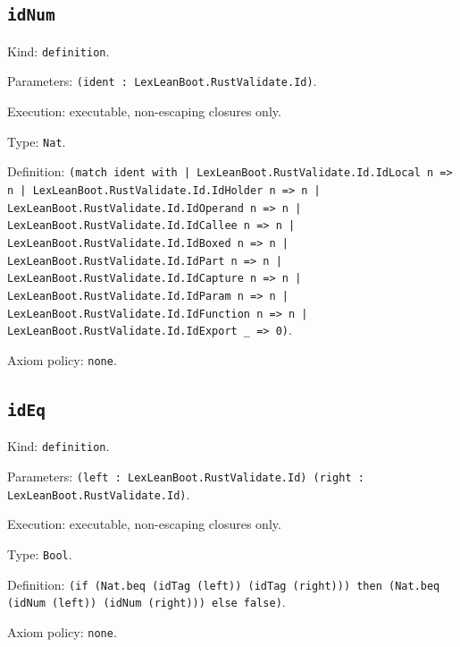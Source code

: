 \documentclass[11pt]{article}
\begin{document}
\subsection*{\texttt{idNum}}
\noindent Kind: \texttt{definition}.\par
\noindent Parameters: \texttt{(ident : LexLeanBoot.RustValidate.Id)}.\par
\noindent Execution: executable, non-escaping closures only.\par
\noindent Type: \texttt{Nat}.\par
\noindent Definition: \texttt{(match ident with | LexLeanBoot.RustValidate.Id.IdLocal n => n | LexLeanBoot.RustValidate.Id.IdHolder n => n | LexLeanBoot.RustValidate.Id.IdOperand n => n | LexLeanBoot.RustValidate.Id.IdCallee n => n | LexLeanBoot.RustValidate.Id.IdBoxed n => n | LexLeanBoot.RustValidate.Id.IdPart n => n | LexLeanBoot.RustValidate.Id.IdCapture n => n | LexLeanBoot.RustValidate.Id.IdParam n => n | LexLeanBoot.RustValidate.Id.IdFunction n => n | LexLeanBoot.RustValidate.Id.IdExport \_ => 0)}.\par
\noindent Axiom policy: \texttt{none}.\par
\subsection*{\texttt{idEq}}
\noindent Kind: \texttt{definition}.\par
\noindent Parameters: \texttt{(left : LexLeanBoot.RustValidate.Id) (right : LexLeanBoot.RustValidate.Id)}.\par
\noindent Execution: executable, non-escaping closures only.\par
\noindent Type: \texttt{Bool}.\par
\noindent Definition: \texttt{(if (Nat.beq (idTag (left)) (idTag (right))) then (Nat.beq (idNum (left)) (idNum (right))) else false)}.\par
\noindent Axiom policy: \texttt{none}.\par
\end{document}
